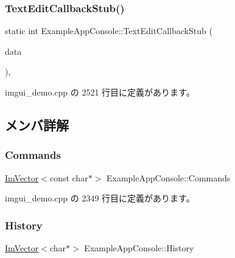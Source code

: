 \subsubsection{\texorpdfstring{Text\+Edit\+Callback\+Stub()}{TextEditCallbackStub()}}
{\footnotesize\ttfamily static int Example\+App\+Console\+::\+Text\+Edit\+Callback\+Stub (\begin{DoxyParamCaption}\item[{\mbox{\hyperlink{struct_im_gui_text_edit_callback_data}{Im\+Gui\+Text\+Edit\+Callback\+Data}} $\ast$}]{data }\end{DoxyParamCaption})\hspace{0.3cm}{\ttfamily [inline]}, {\ttfamily [static]}}



 imgui\+\_\+demo.\+cpp の 2521 行目に定義があります。



\subsection{メンバ詳解}
\mbox{\label{struct_example_app_console_a1eebee69cceb0345cf9d9b6e6beb9d03}} 
\subsubsection{\texorpdfstring{Commands}{Commands}}
{\footnotesize\ttfamily \mbox{\hyperlink{class_im_vector}{Im\+Vector}}$<$const char$\ast$$>$ Example\+App\+Console\+::\+Commands}



 imgui\+\_\+demo.\+cpp の 2349 行目に定義があります。

\mbox{\label{struct_example_app_console_a11c7fa54e744288f3606e4d6521d6345}} 
\subsubsection{\texorpdfstring{History}{History}}
{\footnotesize\ttfamily \mbox{\hyperlink{class_im_vector}{Im\+Vector}}$<$char$\ast$$>$ Example\+App\+Console\+::\+History}



